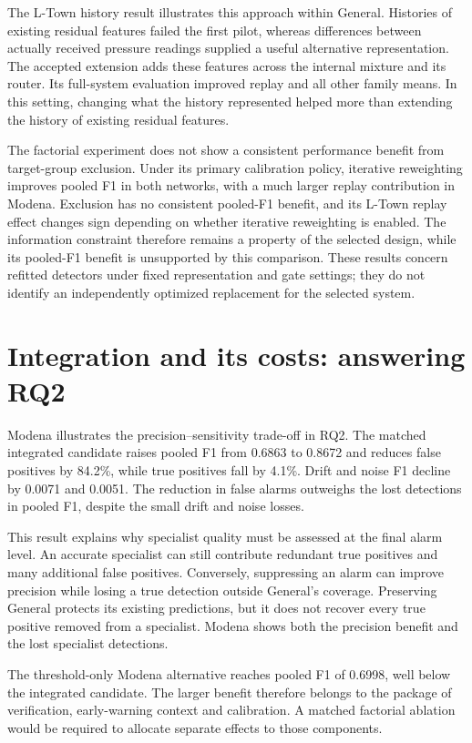 The L-Town history result illustrates this approach within General. Histories of existing residual features failed the first pilot, whereas differences between actually received pressure readings supplied a useful alternative representation. The accepted extension adds these features across the internal mixture and its router. Its full-system evaluation improved replay and all other family means. In this setting, changing what the history represented helped more than extending the history of existing residual features.

The factorial experiment does not show a consistent performance benefit from target-group exclusion. Under its primary calibration policy, iterative reweighting improves pooled F1 in both networks, with a much larger replay contribution in Modena. Exclusion has no consistent pooled-F1 benefit, and its L-Town replay effect changes sign depending on whether iterative reweighting is enabled. The information constraint therefore remains a property of the selected design, while its pooled-F1 benefit is unsupported by this comparison. These results concern refitted detectors under fixed representation and gate settings; they do not identify an independently optimized replacement for the selected system.

\section{Integration and its costs: answering RQ2}
Modena illustrates the precision--sensitivity trade-off in RQ2. The matched integrated candidate raises pooled F1 from 0.6863 to 0.8672 and reduces false positives by 84.2\%, while true positives fall by 4.1\%. Drift and noise F1 decline by 0.0071 and 0.0051. The reduction in false alarms outweighs the lost detections in pooled F1, despite the small drift and noise losses.

This result explains why specialist quality must be assessed at the final alarm level. An accurate specialist can still contribute redundant true positives and many additional false positives. Conversely, suppressing an alarm can improve precision while losing a true detection outside General's coverage. Preserving General protects its existing predictions, but it does not recover every true positive removed from a specialist. Modena shows both the precision benefit and the lost specialist detections.

The threshold-only Modena alternative reaches pooled F1 of 0.6998, well below the integrated candidate. The larger benefit therefore belongs to the package of verification, early-warning context and calibration. A matched factorial ablation would be required to allocate separate effects to those components.

